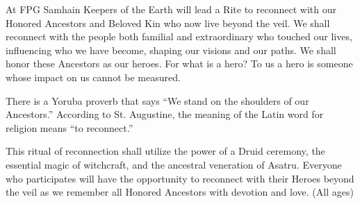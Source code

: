  At FPG Samhain Keepers of the Earth will lead a Rite to reconnect with our Honored Ancestors and Beloved Kin who now live beyond the veil. We shall reconnect with the people both familial and extraordinary who touched our lives, influencing who we have become, shaping our visions and our paths. We shall honor these Ancestors as our heroes. For what is a hero? To us a hero is someone whose impact on us cannot be measured.
 
There is a Yoruba proverb that says  ``We stand on the shoulders of our Ancestors.''  According to St. Augustine, the meaning of the Latin word for religion means  ``to reconnect.'' 
 
This ritual of reconnection shall utilize the power of a Druid ceremony, the essential magic of witchcraft, and the ancestral veneration of Asatru. Everyone who participates will have the opportunity to reconnect with their Heroes beyond the veil as we remember all Honored Ancestors with devotion and love. {\small (All ages)}